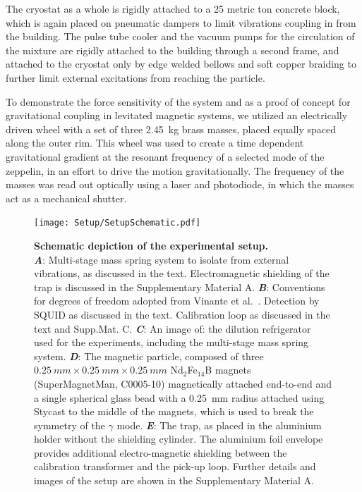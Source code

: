 \documentclass[pdflatex,sn-mathphys]{sn-jnl}
\begin{document}
    The cryostat as a whole is rigidly attached to a 25 metric ton concrete block, which is again placed on pneumatic dampers to limit vibrations coupling in from the building. The pulse tube cooler and the vacuum pumps for the circulation of the mixture are rigidly attached to the building through a second frame, and attached to the cryostat only by edge welded bellows and soft copper braiding to further limit external excitations from reaching the particle.
    
    To demonstrate the force sensitivity of the system and as a proof of concept for gravitational coupling in levitated magnetic systems, we utilized an electrically driven wheel with a set of three \SI{2.45}{kg} brass masses, placed equally spaced along the outer rim.
    This wheel was used to create a time dependent gravitational gradient at the resonant frequency of a selected mode of the zeppelin, in an effort to drive the motion gravitationally.
    The frequency of the masses was read out optically using a laser and photodiode, in which the masses act as a mechanical shutter.


    \begin{figure}[ht]
        \centering
        \texttt{[image: Setup/SetupSchematic.pdf]}%
        \caption{\textbf{Schematic depiction of the experimental setup.}\\
        \textbf{\emph{A}}: Multi-stage mass spring system to isolate from external vibrations, as discussed in the text. Electromagnetic shielding of the trap is discussed in the Supplementary Material A.
        \textbf{\emph{B}}: Conventions for degrees of freedom adopted from Vinante et al.~\cite{vinante2020}. Detection by SQUID as discussed in the text.  Calibration loop as discussed in the text and Supp.Mat. C. 
        \textbf{\emph{C}}: An image of: the dilution refrigerator used for the experiments, including the multi-stage mass spring system. 
        \textbf{\emph{D}}: The magnetic particle, composed of three $\SI{0.25}{mm} \times \SI{0.25}{mm} \times \SI{0.25}{mm}$ Nd$_{2}$Fe$_{14}$B magnets (SuperMagnetMan, C0005-10) magnetically attached end-to-end and a single spherical glass bead with a \SI{0.25}{mm} radius attached using Stycast to the middle of the magnets, which is used to break the symmetry of the $\gamma$ mode.
        \textbf{\emph{E}}: The trap, as placed in the aluminium holder without the shielding cylinder. The aluminium foil envelope provides additional electro-magnetic shielding between the calibration transformer and the pick-up loop.
        Further details and images of the setup are shown in the Supplementary Material A.
        }\label{fig1:setup}
    \end{figure}
\end{document}
